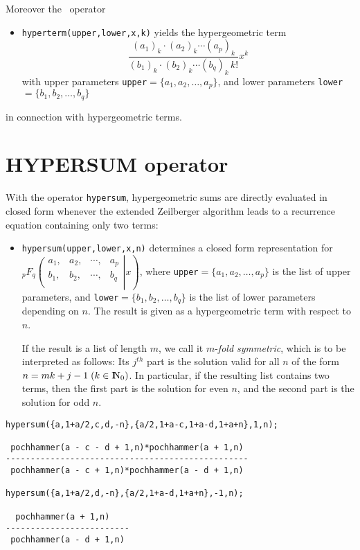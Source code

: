 Moreover the \REDUCE\ operator
\begin{itemize}
\item
{\tt hyperterm(upper,lower,x,k)} yields the
hypergeometric term 
\[
\frac
{(a_{1})_{k}\cdot(a_{2})_{k}\cdots(a_{p})_{k}}
{(b_{1})_{k}\cdot(b_{2})_{k}\cdots(b_{q})_{k}\,k!}x^{k}
\]
with upper parameters {\tt upper}$=\{a_{1}, a_{2}, \ldots, a_{p}\}$,
and lower parameters {\tt lower}$=\{b_{1}, b_{2}, \ldots, b_{q}\}$
\end{itemize}
in connection with hypergeometric terms.

\section{HYPERSUM operator}

With the operator {\tt hypersum}, hypergeometric
sums are directly evaluated in closed form whenever the extended 
Zeilberger algorithm leads to a recurrence equation containing only
two terms:
\begin{itemize}
\item
{\tt hypersum(upper,lower,x,n)} determines a closed form representation
for\\
$_{p}F_{q}\left.\left(\begin{array}{cccc}
a_{1},&a_{2},&\cdots,&a_{p}\\
b_{1},&b_{2},&\cdots,&b_{q}\\
            \end{array}\right| x\right)
 $, where {\tt upper}$=\{a_{1}, a_{2}, \ldots, a_{p}\}$
 is the list of upper parameters, and
{\tt lower}$=\{b_{1}, b_{2}, \ldots, b_{q}\}$
is the list of lower parameters depending on $n$. The result is given as a 
hypergeometric term with respect to $n$.  

If the result is a list of length $m$, we call it $m$-{\sl fold symmetric},
which is to be interpreted as follows:
Its $j^{th}$ part is the solution valid for all $n$ of the form $n=mk+j-1
\;(k\in\N_0)$.
In particular, if the resulting list contains two terms, then the
first part is the solution for even $n$, and the second part is the
solution for odd $n$.
\end{itemize}

\begin{verbatim}
hypersum({a,1+a/2,c,d,-n},{a/2,1+a-c,1+a-d,1+a+n},1,n);

 pochhammer(a - c - d + 1,n)*pochhammer(a + 1,n)
-------------------------------------------------
 pochhammer(a - c + 1,n)*pochhammer(a - d + 1,n)

hypersum({a,1+a/2,d,-n},{a/2,1+a-d,1+a+n},-1,n);

  pochhammer(a + 1,n)
-------------------------
 pochhammer(a - d + 1,n)
\end{verbatim}

